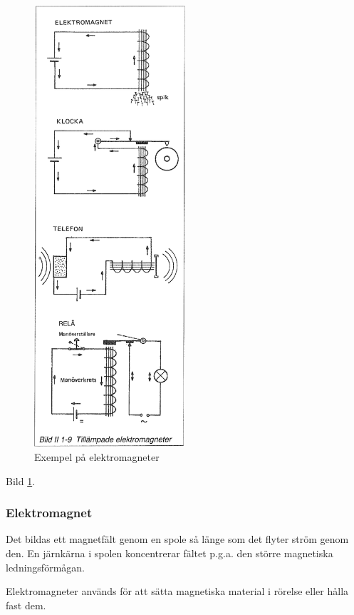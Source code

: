 \begin{figure}
  \includegraphics[width=0.5\textwidth]{images/bild_2_1-09}
  \caption{Exempel på elektromagneter}
  \label{fig:BildII1-9}
\end{figure}

Bild \ref{fig:BildII1-9}.

\subsubsection{Elektromagnet}
Det bildas ett magnetfält genom en spole så länge som det flyter ström genom
den. En järnkärna i spolen koncentrerar fältet p.g.a. den större magnetiska
ledningsförmågan.

Elektromagneter används för att sätta magnetiska material i rörelse eller hålla
fast dem.

